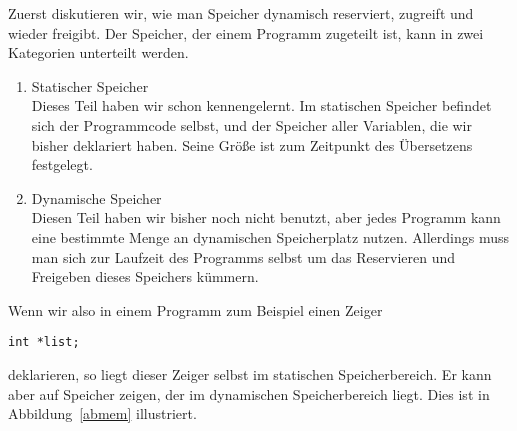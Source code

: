 Zuerst diskutieren wir, wie man Speicher dynamisch reserviert, zugreift und wieder freigibt.
Der Speicher, der einem Programm zugeteilt ist, kann in zwei Kategorien unterteilt werden.
\begin{enumerate}
\item Statischer Speicher\\
  Dieses Teil haben wir schon kennengelernt. 
  Im statischen Speicher befindet sich der Programmcode selbst, und der Speicher aller Variablen, die wir bisher deklariert haben.
  Seine Größe ist zum Zeitpunkt des Übersetzens festgelegt.

\item Dynamische Speicher\\
  Diesen Teil haben wir bisher noch nicht benutzt, aber jedes Programm kann eine bestimmte Menge an dynamischen Speicherplatz nutzen.
  Allerdings muss man sich zur Laufzeit des Programms selbst um das Reservieren und Freigeben dieses Speichers kümmern.
\end{enumerate}

Wenn wir also in einem Programm zum Beispiel einen Zeiger
\begin{lstlisting}
int *list;
\end{lstlisting}
deklarieren, so liegt dieser Zeiger selbst im statischen Speicherbereich.
Er kann aber auf Speicher zeigen, der im dynamischen Speicherbereich liegt.
Dies ist in Abbildung~\ref{abmem} illustriert.

%
%
%

